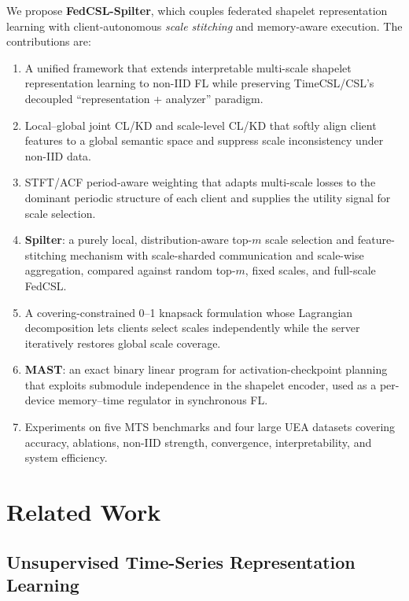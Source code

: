 \documentclass[sigconf]{acmart}
\begin{document}
We propose \textbf{FedCSL-Spilter}, which couples federated shapelet
representation learning with client-autonomous \emph{scale stitching} and
memory-aware execution. The contributions are:

\begin{enumerate}
  \item A unified framework that extends interpretable multi-scale shapelet
        representation learning to non-IID FL while preserving TimeCSL/CSL's
        decoupled ``representation + analyzer'' paradigm.
  \item Local--global joint CL/KD and scale-level CL/KD that softly align client
        features to a global semantic space and suppress scale inconsistency
        under non-IID data.
  \item STFT/ACF period-aware weighting that adapts multi-scale losses to the
        dominant periodic structure of each client and supplies the utility
        signal for scale selection.
  \item \textbf{Spilter}: a purely local, distribution-aware top-$m$ scale
        selection and feature-stitching mechanism with scale-sharded
        communication and scale-wise aggregation, compared against random
        top-$m$, fixed scales, and full-scale FedCSL.
  \item A covering-constrained 0--1 knapsack formulation whose Lagrangian
        decomposition lets clients select scales independently while the server
        iteratively restores global scale coverage.
  \item \textbf{MAST}: an exact binary linear program for activation-checkpoint
        planning that exploits submodule independence in the shapelet encoder,
        used as a per-device memory--time regulator in synchronous FL.
  \item Experiments on five MTS benchmarks and four large UEA datasets covering
        accuracy, ablations, non-IID strength, convergence, interpretability,
        and system efficiency.
\end{enumerate}

\section{Related Work}

\subsection{Unsupervised Time-Series Representation Learning}
\end{document}
